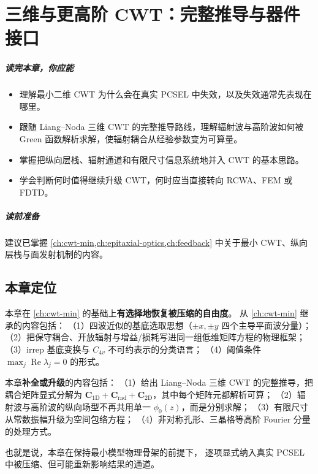 \chapter{三维与更高阶 CWT：完整推导与器件接口}
\label{ch:cwt-3d}

\paragraph{读完本章，你应能}
\begin{itemize}
  \item 理解最小二维 CWT 为什么会在真实 PCSEL 中失效，以及失效通常先表现在哪里。
  \item 跟随 Liang--Noda 三维 CWT 的完整推导路线，理解辐射波与高阶波如何被 Green 函数解析求解，使辐射耦合从经验参数变为可算量。
  \item 掌握把纵向层栈、辐射通道和有限尺寸信息系统地并入 CWT 的基本思路。
  \item 学会判断何时值得继续升级 CWT，何时应当直接转向 RCWA、FEM 或 FDTD。
\end{itemize}

\paragraph{读前准备}
建议已掌握 \cref{ch:cwt-min,ch:epitaxial-optics,ch:feedback} 中关于最小 CWT、纵向层栈与面发射机制的内容。

\section*{本章定位}
本章在 \cref{ch:cwt-min} 的基础上\textbf{有选择地恢复被压缩的自由度}。
从 \cref{ch:cwt-min} 继承的内容包括：
（1）四波近似的基底选取思想（$\pm x, \pm y$ 四个主导平面波分量）；
（2）把保守耦合、开放辐射与增益/损耗写进同一组低维矩阵方程的物理框架；
（3）irrep 基底变换与 $C_{4v}$ 不可约表示的分类语言；
（4）阈值条件 $\max_j\operatorname{Re}\lambda_j=0$ 的形式。

本章\textbf{补全或升级}的内容包括：
（1）给出 Liang--Noda 三维 CWT 的完整推导，把耦合矩阵显式分解为 $\bm C_{\mathrm{1D}}+\bm C_{\mathrm{rad}}+\bm C_{\mathrm{2D}}$，其中每个矩阵元都解析可算；
（2）辐射波与高阶波的纵向场型不再共用单一 $\phi_0(z)$，而是分别求解；
（3）有限尺寸从常数振幅升级为空间包络方程；
（4）非对称孔形、三晶格等高阶 Fourier 分量的处理方式。

也就是说，本章在保持最小模型物理骨架的前提下，
逐项显式纳入真实 PCSEL 中被压缩、但可能重新影响结果的通道。

